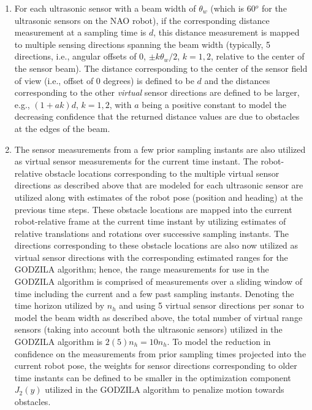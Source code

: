 \begin{enumerate}
	\item
    For each ultrasonic sensor with a beam width of $\theta_w$ (which is 60$^o$ for the ultrasonic sensors on the NAO robot), if the corresponding distance measurement at a sampling time is $d$, this distance measurement is mapped to multiple sensing directions spanning the beam width (typically, 5 directions, i.e., angular offsets of $0$, $\pm k\theta_w/2$, $k=1,2$, relative to the center of the sensor beam). The distance corresponding to the center of the sensor field of view (i.e., offset of
    $0$ degrees) is defined to be $d$ and the distances corresponding to the other {\em virtual} sensor directions are defined to be larger, e.g., $(1+ak)d$, $k=1,2$, with $a$ being a positive constant to model the decreasing confidence that the returned distance values are due to obstacles at the edges of the beam. 
    
    \item The sensor measurements from a few prior sampling instants are also utilized as virtual sensor measurements for the current time instant. The robot-relative obstacle locations corresponding to the multiple virtual sensor directions as described above that are modeled for each ultrasonic sensor are utilized along with estimates of the robot pose (position and heading) at the previous time steps. These obstacle locations are mapped into the current robot-relative frame at the current time instant by utilizing estimates of relative translations and rotations over successive sampling instants. The directions corresponding to these obstacle locations are also now utilized as virtual sensor directions with the corresponding estimated ranges for the GODZILA algorithm; hence, the range measurements for use in the GODZILA algorithm is comprised of  measurements over a sliding window of time including the current and a few past sampling instants. Denoting the time horizon utilized by $n_h$ and using 5 virtual sensor directions per sonar to model the beam width as described above, the total number of virtual range sensors (taking into account both the ultrasonic sensors) utilized in the GODZILA algorithm is $2(5)n_h=10n_h$. To model the reduction in
    confidence on the measurements from prior sampling times projected into the current robot pose, the weights for sensor directions corresponding to older time instants can be defined to be smaller in the optimization component $J_2(y)$ utilized in the GODZILA algorithm to penalize motion towards obstacles.
\end{enumerate}

